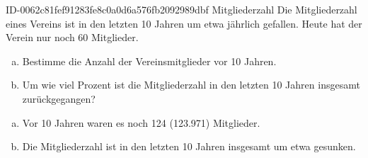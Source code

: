 \begin{exercise}
      {ID-0062c81fef91283fe8c0a0d6a576fb2092989dbf}
      {Mitgliederzahl}
  \ifproblem\problem
    Die Mitgliederzahl eines Vereins ist in den letzten 10
    Jahren um etwa  jährlich gefallen. Heute hat der
    Verein nur noch 60 Mitglieder.
    \begin{enumerate}[a)]
      \item Bestimme die Anzahl der Vereinsmitglieder vor 10 Jahren.
      \item Um wie viel Prozent ist die Mitgliederzahl in den letzten
            10 Jahren insgesamt zurückgegangen?
    \end{enumerate}
  \fi
  \ifoutcome\outcome
    \begin{enumerate}[a)]
      \item Vor 10 Jahren waren es noch \num{124} (\num{123.971})
            Mitglieder.
      \item Die Mitgliederzahl ist in den letzten 10 Jahren
            insgesamt um etwa  gesunken.
    \end{enumerate}
  \fi
\end{exercise}
